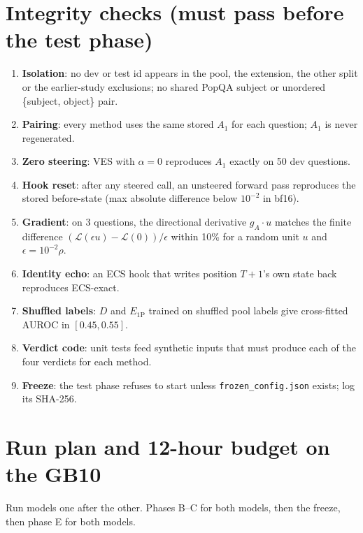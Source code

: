 \documentclass[11pt]{article}
\begin{document}
\section{Integrity checks (must pass before the test phase)}\label{sec:checks}
\begin{enumerate}
  \item \textbf{Isolation}: no dev or test id appears in the pool, the extension, the other split or the
        earlier-study exclusions; no shared PopQA subject or unordered \{subject, object\} pair.
  \item \textbf{Pairing}: every method uses the same stored $A_1$ for each question; $A_1$ is never regenerated.
  \item \textbf{Zero steering}: VES with $\alpha = 0$ reproduces $A_1$ exactly on 50 dev questions.
  \item \textbf{Hook reset}: after any steered call, an unsteered forward pass reproduces the stored before-state
        (max absolute difference below $10^{-2}$ in bf16).
  \item \textbf{Gradient}: on 3 questions, the directional derivative $g_A \cdot u$ matches the finite difference
        $(\mathcal{L}(\epsilon u) - \mathcal{L}(0))/\epsilon$ within 10\% for a random unit $u$ and
        $\epsilon = 10^{-2}\rho$.
  \item \textbf{Identity echo}: an ECS hook that writes position $T{+}1$'s own state back reproduces ECS-exact.
  \item \textbf{Shuffled labels}: $D$ and $E_{\mathrm{1P}}$ trained on shuffled pool labels give cross-fitted
        AUROC in $[0.45, 0.55]$.
  \item \textbf{Verdict code}: unit tests feed synthetic inputs that must produce each of the four verdicts for
        each method.
  \item \textbf{Freeze}: the test phase refuses to start unless \texttt{frozen\_config.json} exists; log its SHA-256.
\end{enumerate}

\section{Run plan and 12-hour budget on the GB10}

Run models one after the other. Phases B--C for both models, then the freeze, then phase E for both models.
\end{document}
